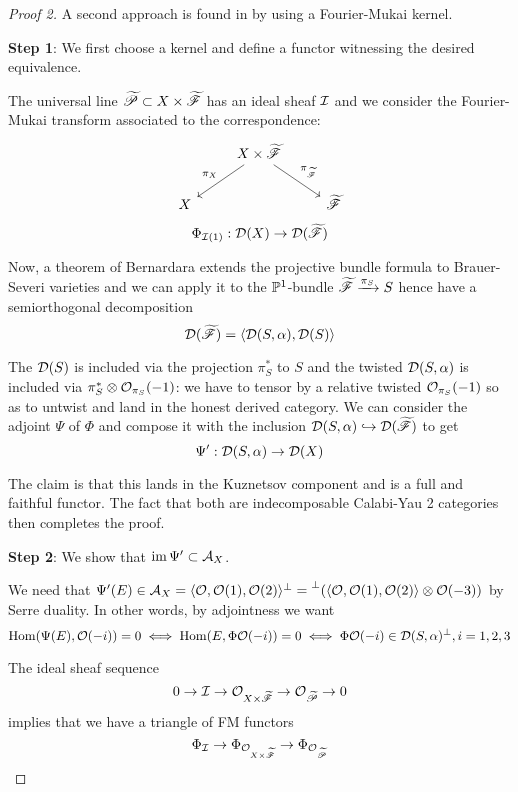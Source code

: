 \begin{proof}[Proof 2]
A second approach is found in \cite[\S7]{huybrechts_geometry_2023} by using a Fourier-Mukai kernel. 

\textbf{Step 1}: We first choose a kernel and define a functor witnessing the desired equivalence.

The universal line $\tscrP\subset X \times \tscrF$ has an ideal sheaf $\calI$ and we consider the Fourier-Mukai transform associated to the correspondence: 
\[\begin{tikzcd}
    & X\times \tscrF \arrow[ld, "\pi_X"'] \arrow[rd, "\pi_{\tscrF}"] &        \\
  X &                                                                & \tscrF
  \end{tikzcd}\]
$$\Phi_{\calI(1)}: \calD(X)\rightarrow \calD(\tscrF)$$

Now, a theorem of Bernardara \cite{bernardara_semiorthogonal_2005} extends the projective bundle formula to Brauer-Severi varieties and we can apply it to the $\P^1$-bundle $\tscrF\xrightarrow{\pi_S} S$ hence have a semiorthogonal decomposition $$\calD(\tscrF)=\langle \calD(S,\alpha), \calD(S)\rangle$$

The $\calD(S)$ is included via the projection $\pi_S^*$ to $S$ and the twisted $\calD(S,\alpha)$ is included via $\pi_S^*\otimes \O_{\pi_S}(-1)$: we have to tensor by a relative twisted $\O_{\pi_S}(-1)$ so as to untwist and land in the honest derived category. We can consider the adjoint $\Psi$ of $\Phi$ and compose it with the inclusion  $\calD(S,\alpha)\hookrightarrow \calD(\tscrF)$ to get $$\Psi':\calD(S,\alpha)\rightarrow \calD(X)$$

The claim is that this lands in the Kuznetsov component and is a full and faithful functor. The fact that both are indecomposable Calabi-Yau 2 categories then completes the proof.

\textbf{Step 2}: We show that $\im \Psi'\subset \calA_X$.

We need that $\Psi'(E)\in \calA_X= \langle \O, \O(1), \O(2)\rangle ^\perp = \lperp ( \langle \O, \O(1), \O(2)\rangle\otimes \O(-3))$ by Serre duality. In other words, by adjointness we want $$\Hom(\Psi(E), \O(-i))=0 \iff \Hom (E, \Phi \O(-i))=0 \iff \Phi \O(-i) \in \calD(S,\alpha)^\perp, i=1,2,3$$

The ideal sheaf sequence $$0\rightarrow \calI \rightarrow \O_{X\times \tscrF}\rightarrow \O_{\tscrP}\rightarrow 0$$ implies that we have a triangle of FM functors $$\Phi_{\cal I}\rightarrow \Phi_{\O_{X\times \tscrF}}\rightarrow \Phi_{\O_{\tscrP}}$$


\end{proof}
